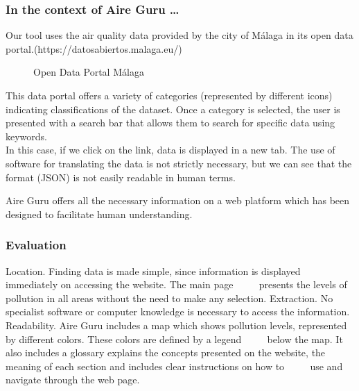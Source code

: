 \subsubsection*{In the context of Aire Guru \ldots} 

Our tool uses the air quality data provided by the city of Málaga in its open data portal.(https://datosabiertos.malaga.eu/)\\
\newpage
\begin{figure}[ht]
    \centering
    \hfill
    \vfill
  \caption{Open Data Portal Málaga}
\end{figure}

    This data portal offers a variety of categories (represented by different icons) indicating classifications of the dataset.
    Once a category is selected, the user is presented with a search bar that allows them to search for specific data using keywords.\\
    
    In this case, if we click on the link, data is displayed in a new tab. The use of software
    for translating the data is not strictly necessary, but we can see that the format (JSON) is not easily readable in human terms.

Aire Guru offers all the necessary information on a web platform which has been designed to facilitate human understanding.

\subsubsection*{Evaluation}  

\begin{itemize}
    \done Location. Finding data is made simple, since information is displayed immediately on accessing the website. The main page
         presents the levels of pollution in all areas without the need to make any selection.
    \done Extraction. No specialist software or computer knowledge is necessary to access the information.
    \done Readability. Aire Guru includes a map which shows pollution levels, represented by different colors. These colors are defined by a legend
         below the map. It also includes a glossary explains the concepts presented on the website, the meaning of each section and includes clear instructions on how to
         use and navigate through the web page.
\end{itemize}